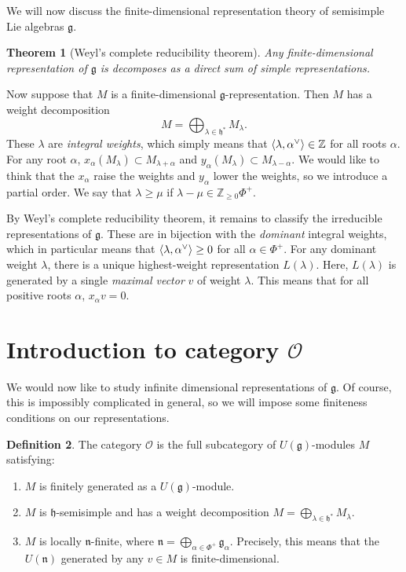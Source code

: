 \documentclass[leqno, openany]{memoir}
\newtheorem{thm}{Theorem}[section]
\theoremstyle{definition}
\newtheorem{defn}[thm]{Definition}
\theoremstyle{remark}
\theoremstyle{plain}
\theoremstyle{definition}
\theoremstyle{remark}
\newcommand{\Z}{\mathbb{Z}}
\newcommand{\mc}[1]{\mathcal{#1}}
\newcommand{\mf}[1]{\mathfrak{#1}}
\begin{document}
We will now discuss the finite-dimensional representation theory of semisimple Lie algebras $\mf{g}$.

\begin{thm}[Weyl's complete reducibility theorem]
    Any finite-dimensional representation of $\mf{g}$ is decomposes as a direct sum of simple representations.
\end{thm}

Now suppose that $M$ is a finite-dimensional $\mf{g}$-representation. Then $M$ has a weight decomposition
\[ M = \bigoplus_{\lambda \in \mf{h}^*} M_{\lambda}. \]
These $\lambda$ are \textit{integral weights}, which simply means that $\ev{\lambda, \alpha^{\vee}} \in \Z$ for all roots $\alpha$. For any root $\alpha$, $x_{\alpha}(M_{\lambda}) \subset M_{\lambda + \alpha}$ and $y_{\alpha}(M_{\lambda}) \subset M_{\lambda - \alpha}$. We would like to think that the $x_{\alpha}$ raise the weights and $y_{\alpha}$ lower the weights, so we introduce a partial order. We say that $\lambda \geq \mu$ if $\lambda - \mu \in \Z_{\geq 0} \Phi^+$.

By Weyl's complete reducibility theorem, it remains to classify the irreducible representations of $\mf{g}$. These are in bijection with the \textit{dominant} integral weights, which in particular means that $\ev{\lambda, \alpha^{\vee}} \geq 0$ for all $\alpha \in \Phi^+$. For any dominant weight $\lambda$, there is a unique highest-weight representation $L(\lambda)$. Here, $L(\lambda)$ is generated by a single \textit{maximal vector} $v$ of weight $\lambda$. This means that for all positive roots $\alpha$, $x_{\alpha} v = 0$.

\section{Introduction to category $\mc{O}$}%
\label{sec:introduction_to_category_o_}

We would now like to study infinite dimensional representations of $\mf{g}$. Of course, this is impossibly complicated in general, so we will impose some finiteness conditions on our representations.

\begin{defn}
    The category $\mc{O}$ is the full subcategory of $U(\mf{g})$-modules $M$ satisfying:
    \begin{enumerate}
        \item $M$ is finitely generated as a $U(\mf{g})$-module.
        \item $M$ is $\mf{h}$-semisimple and has a weight decomposition $M = \bigoplus_{\lambda \in \mf{h}^*} M_{\lambda}$.
        \item $M$ is locally $\mf{n}$-finite, where $\mf{n} = \bigoplus_{\alpha \in \Phi^+} \mf{g_{\alpha}}$. Precisely, this means that the $U(\mf{n})$ generated by any $v \in M$ is finite-dimensional.
    \end{enumerate}
\end{defn}
\end{document}
